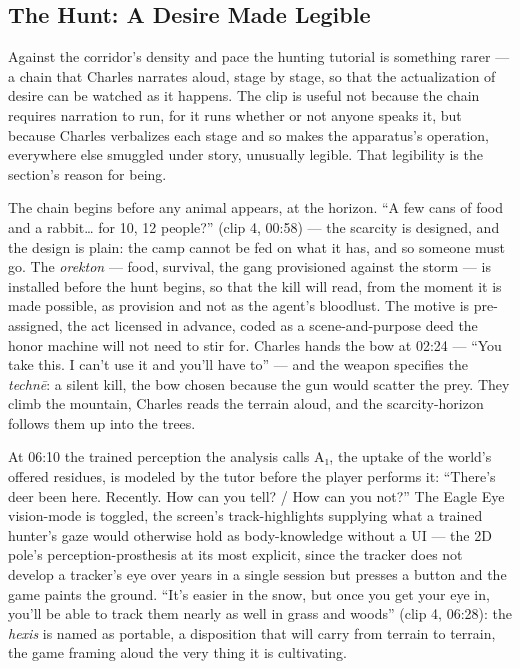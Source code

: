 \bigskip

\subsection*{The Hunt: A Desire Made Legible}

Against the corridor's density and pace the hunting tutorial is something rarer — a chain that Charles narrates aloud, stage by stage, so that the actualization of desire can be watched as it happens. The clip is useful not because the chain requires narration to run, for it runs whether or not anyone speaks it, but because Charles verbalizes each stage and so makes the apparatus's operation, everywhere else smuggled under story, unusually legible. That legibility is the section's reason for being.

The chain begins before any animal appears, at the horizon. ``A few cans of food and a rabbit… for 10, 12 people?'' (clip 4, 00:58) — the scarcity is designed, and the design is plain: the camp cannot be fed on what it has, and so someone must go. The \textit{orekton} — food, survival, the gang provisioned against the storm — is installed before the hunt begins, so that the kill will read, from the moment it is made possible, as provision and not as the agent's bloodlust. The motive is pre-assigned, the act licensed in advance, coded as a scene-and-purpose deed the honor machine will not need to stir for. Charles hands the bow at 02:24 — ``You take this. I can't use it and you'll have to'' — and the weapon specifies the \textit{technē}: a silent kill, the bow chosen because the gun would scatter the prey. They climb the mountain, Charles reads the terrain aloud, and the scarcity-horizon follows them up into the trees.

At 06:10 the trained perception the analysis calls A₁, the uptake of the world's offered residues, is modeled by the tutor before the player performs it: ``There's deer been here. Recently. How can you tell? / How can you not?'' The Eagle Eye vision-mode is toggled, the screen's track-highlights supplying what a trained hunter's gaze would otherwise hold as body-knowledge without a UI — the 2D pole's perception-prosthesis at its most explicit, since the tracker does not develop a tracker's eye over years in a single session but presses a button and the game paints the ground. ``It's easier in the snow, but once you get your eye in, you'll be able to track them nearly as well in grass and woods'' (clip 4, 06:28): the \textit{hexis} is named as portable, a disposition that will carry from terrain to terrain, the game framing aloud the very thing it is cultivating.

